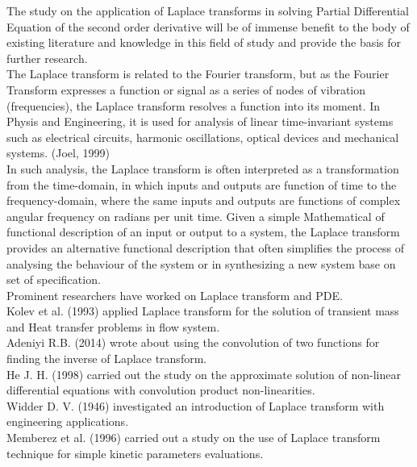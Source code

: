 \documentclass[11pt]{report}
\newcommand{\NI}{\noindent}
\begin{document}
	\NI The study on the application of Laplace transforms in solving Partial Differential Equation of the second order derivative will be of immense benefit to the body of existing literature and knowledge in this field of study and provide the basis for further research.\\
	
	\NI The Laplace transform is related to the Fourier transform, but as the Fourier Transform expresses a function or signal as a series of nodes of vibration (frequencies), the Laplace transform resolves a function into its moment. In Physis and Engineering, it is used for analysis of linear time-invariant systems such as electrical circuits, harmonic oscillations, optical devices and mechanical systems. (Joel, 1999)\\
	
	\NI In such analysis, the Laplace transform is often interpreted as a transformation from the time-domain, in which inputs and outputs are function of time to the frequency-domain, where the same inputs and outputs are functions of complex angular frequency on radians per unit time. Given a simple Mathematical of functional description of an input or output to a system, the Laplace transform provides an alternative functional description that often simplifies the process of analysing the behaviour of the system or in synthesizing a new system base on set of specification.\\
	
	\NI Prominent researchers have worked on Laplace transform and PDE.\\
	
	\NI Kolev et al. (1993) applied Laplace transform for the solution of transient mass and Heat transfer problems in flow system.\\
	
	\NI Adeniyi R.B. (2014) wrote about using the convolution of two functions for finding the inverse of Laplace transform.\\
	
	\NI He J. H. (1998) carried out the study on the approximate solution of non-linear differential equations with convolution product non-linearities. \\
	
	\NI Widder D. V. (1946) investigated an introduction of Laplace transform with engineering applications.\\
	
	\NI Memberez et al. (1996) carried out a study on the use of Laplace transform technique for simple kinetic parameters evaluations.\\
	
\end{document}
